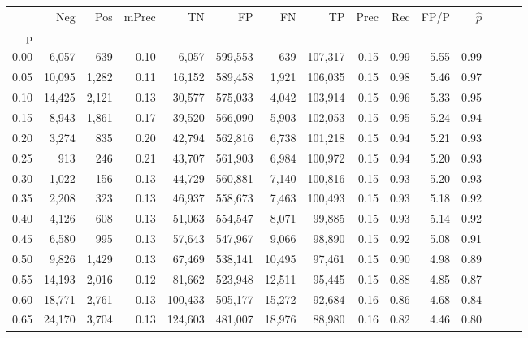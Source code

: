 \begin{tabular}{rrrrrrrrrrrrrrr}
\toprule
{} &      Neg &     Pos & mPrec &       TN &       FP &       FN &       TP &  Prec &   Rec &  FP/P & $\hat{p}$ \\
p    &          &         &       &          &          &          &          &       &       &       &           \\
\midrule
0.00 &    6,057 &     639 &  0.10 &    6,057 &  599,553 &      639 &  107,317 &  0.15 &  0.99 &  5.55 &      0.99 \\
0.05 &   10,095 &   1,282 &  0.11 &   16,152 &  589,458 &    1,921 &  106,035 &  0.15 &  0.98 &  5.46 &      0.97 \\
0.10 &   14,425 &   2,121 &  0.13 &   30,577 &  575,033 &    4,042 &  103,914 &  0.15 &  0.96 &  5.33 &      0.95 \\
0.15 &    8,943 &   1,861 &  0.17 &   39,520 &  566,090 &    5,903 &  102,053 &  0.15 &  0.95 &  5.24 &      0.94 \\
0.20 &    3,274 &     835 &  0.20 &   42,794 &  562,816 &    6,738 &  101,218 &  0.15 &  0.94 &  5.21 &      0.93 \\
0.25 &      913 &     246 &  0.21 &   43,707 &  561,903 &    6,984 &  100,972 &  0.15 &  0.94 &  5.20 &      0.93 \\
0.30 &    1,022 &     156 &  0.13 &   44,729 &  560,881 &    7,140 &  100,816 &  0.15 &  0.93 &  5.20 &      0.93 \\
0.35 &    2,208 &     323 &  0.13 &   46,937 &  558,673 &    7,463 &  100,493 &  0.15 &  0.93 &  5.18 &      0.92 \\
0.40 &    4,126 &     608 &  0.13 &   51,063 &  554,547 &    8,071 &   99,885 &  0.15 &  0.93 &  5.14 &      0.92 \\
0.45 &    6,580 &     995 &  0.13 &   57,643 &  547,967 &    9,066 &   98,890 &  0.15 &  0.92 &  5.08 &      0.91 \\
0.50 &    9,826 &   1,429 &  0.13 &   67,469 &  538,141 &   10,495 &   97,461 &  0.15 &  0.90 &  4.98 &      0.89 \\
0.55 &   14,193 &   2,016 &  0.12 &   81,662 &  523,948 &   12,511 &   95,445 &  0.15 &  0.88 &  4.85 &      0.87 \\
0.60 &   18,771 &   2,761 &  0.13 &  100,433 &  505,177 &   15,272 &   92,684 &  0.16 &  0.86 &  4.68 &      0.84 \\
0.65 &   24,170 &   3,704 &  0.13 &  124,603 &  481,007 &   18,976 &   88,980 &  0.16 &  0.82 &  4.46 &      0.80 \\

\end{tabular}
